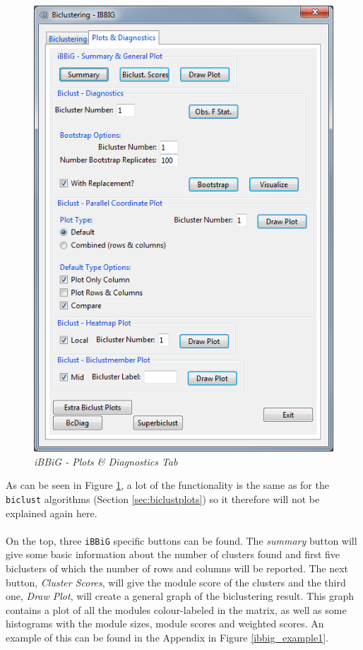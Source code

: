 \documentclass[a4paper]{article}\usepackage[]{graphicx}\usepackage[]{color}
\begin{document}
\begin{figure}[H]
\centering
\includegraphics[scale=0.5]{figures/ibbig_plotdiagtab.png}
\caption{{\it iBBiG - Plots \& Diagnostics Tab}\label{ibbig_plotdiagtab}}
\end{figure}
\noindent As can be seen in Figure \ref{ibbig_plotdiagtab}, a lot of the
functionality is the same as for the \verb|biclust| algorithms (Section \ref{sec:biclustplots}) so it therefore
will not be explained again here.\\ \\
On the top, three \verb|iBBiG| specific buttons can be found. The {\it
summary} button will give some basic information about the number of clusters found and
first five biclusters of which the number of rows and columns will be reported.
The next button, {\it Cluster Scores}, will give the module score of the clusters 
and the third one, {\it Draw Plot}, will create a general graph of the
biclustering result. This graph contains a plot of all the modules
colour-labeled in the matrix, as well as some histograms with the module sizes,
module scores and weighted scores. An example of this can be found in the
Appendix in Figure \ref{ibbig_example1}.
\end{document}
